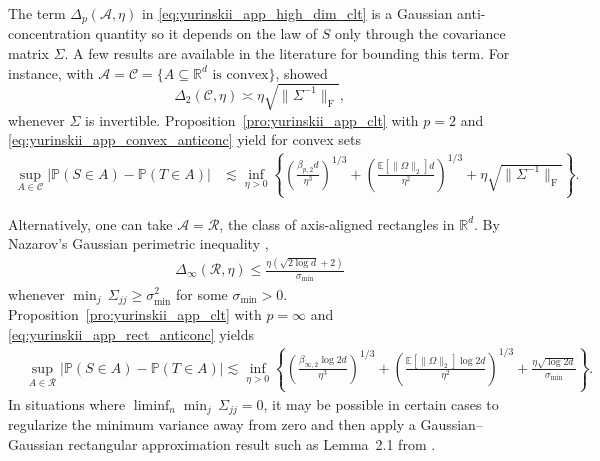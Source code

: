 \documentclass[11pt,lof]{puthesis}
\renewcommand{\P}{\ensuremath{\mathbb{P}}}
\newcommand{\R}{\ensuremath{\mathbb{R}}}
\newcommand{\E}{\ensuremath{\mathbb{E}}}
\newcommand{\rF}{\ensuremath{\mathrm{F}}}
\newcommand{\cR}{\ensuremath{\mathcal{R}}}
\newcommand{\cA}{\ensuremath{\mathcal{A}}}
\newcommand{\cC}{\ensuremath{\mathcal{C}}}
\theoremstyle{break}
\theoremstyle{proof}
\begin{document}
The term $\Delta_p(\cA, \eta)$
in \eqref{eq:yurinskii_app_high_dim_clt} is a Gaussian anti-concentration
quantity
so it depends on the law of $S$ only through the covariance matrix $\Sigma$.
A few results are available in the literature
for bounding this term.
For instance, with
$\cA = \cC = \{A \subseteq \R^d \text{ is convex}\}$,
\citet{nazarov2003maximal} showed
%
\begin{equation}%
  \label{eq:yurinskii_app_convex_anticonc}
  \Delta_2(\cC, \eta)
  \asymp
  \eta\sqrt{\|\Sigma^{-1}\|_{\rF}},
\end{equation}
%
whenever $\Sigma$ is invertible.
Proposition~\ref{pro:yurinskii_app_clt} with $p=2$
and \eqref{eq:yurinskii_app_convex_anticonc} yield for convex sets
%
\begin{align*}
  \sup_{A\in \cC}
  \big|\P(S\in A) -\P(T\in A)\big|
  &\lesssim
  \inf_{\eta > 0}
  \left\{
    \left(\frac{\beta_{p,2} d}{\eta^3}\right)^{1/3}
    + \left(\frac{\E[\|\Omega \|_2] d}{\eta^2}\right)^{1/3}
    + \eta \sqrt{\|\Sigma^{-1}\|_\rF}
  \right\}.
\end{align*}

Alternatively, one can take $\cA = \cR$,
the class of axis-aligned rectangles in $\R^d$.
By Nazarov's Gaussian perimetric inequality
\citep{nazarov2003maximal,chernozhukov2017central},
%
\begin{align}%
  \label{eq:yurinskii_app_rect_anticonc}
  \Delta_\infty(\cR, \eta)
  \leq \frac{\eta (\sqrt{2\log d} + 2)}{\sigma_{\min}}
\end{align}
%
whenever $\min_j \, \Sigma_{j j} \geq \sigma_{\min}^2$
for some $\sigma_{\min}>0$.
Proposition~\ref{pro:yurinskii_app_clt} with $p = \infty$
and \eqref{eq:yurinskii_app_rect_anticonc} yields
%
\begin{align*}%
  &\sup_{A\in \cR}
  \big|\P(S\in A) -\P(T\in A)\big|
  \lesssim
  \inf_{\eta > 0}
  \left\{
    \left(\frac{\beta_{\infty,2} \log 2d}{\eta^3}\right)^{1/3}
    + \left(\frac{\E[\|\Omega \|_2] \log 2d}{\eta^2}\right)^{1/3}
    + \frac{\eta \sqrt{\log 2d}}{\sigma_{\min}}
  \right\}.
\end{align*}
%
In situations where
$\liminf_n \min_j \, \Sigma_{j j} = 0$,
it may be possible in certain cases to regularize
the minimum variance away from zero and then apply
a Gaussian--Gaussian rectangular approximation result
such as Lemma~2.1 from \citet{chernozhukov2023nearly}.
\end{document}
